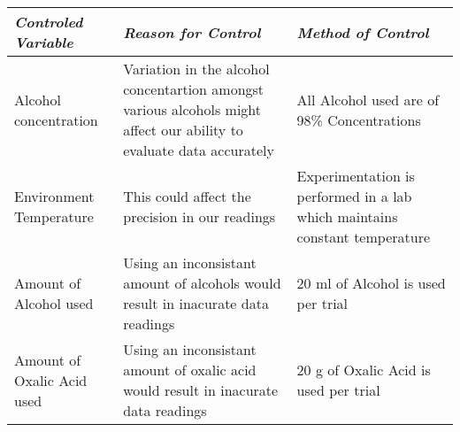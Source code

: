 \begin{table}[H]
  \centering
    \begin{tabular}{|p{10em}|p{12em}|p{12em}|}
    \hline
    \hline
    \textit{Controled Variable} & \textit{Reason for Control} & \textit{Method of Control} \\
    \hline
    \hline
    Alcohol concentration & Variation in the alcohol concentartion amongst various alcohols might affect our ability to evaluate data accurately & All Alcohol used are of 98\% Concentrations   \\
    \hline
    Environment Temperature & This could affect the precision in our readings & Experimentation is performed in a lab which maintains constant temperature \\
    \hline
    Amount of Alcohol used & Using an inconsistant amount of alcohols would result in inacurate data readings & 20 ml of Alcohol is used per trial \\
    \hline
    Amount of Oxalic Acid used & Using an inconsistant amount of oxalic acid would result in inacurate data readings & 20 g of Oxalic Acid is used per trial \\
    \hline
    \hline
    \end{tabular}%
  \label{tab:addlabel}%
\end{table}%






